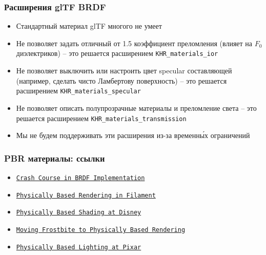 \documentclass[10pt]{beamer}
\begin{document}
\begin{frame}
\frametitle{Расширения glTF BRDF}
\begin{itemize}
\item Стандартный материал glTF многого не умеет
\pause
\item Не позволяет задать отличный от 1.5 коэффициент преломления (влияет на \begin{math}F_0\end{math} диэлектриков) -- это решается расширением \texttt{KHR\_materials\_ior}
\pause
\item Не позволяет выключить или настроить цвет specular составляющей (например, сделать чисто Ламбертову поверхность) -- это решается расширением \texttt{KHR\_materials\_specular}
\pause
\item Не позволяет описать полупрозрачные материалы и преломление света -- это решается расширением \texttt{KHR\_materials\_transmission}
\pause
\item Мы не будем поддерживать эти расширения из-за временны́х ограничений
\end{itemize}
\end{frame}

\begin{frame}
\frametitle{PBR материалы: ссылки}
\begin{itemize}
\item \href{https://boksajak.github.io/files/CrashCourseBRDF.pdf}{\texttt{Crash Course in BRDF Implementation}}
\item \href{https://google.github.io/filament/Filament.html}{\texttt{Physically Based Rendering in Filament}}
\item \href{https://media.disneyanimation.com/uploads/production/publication_asset/48/asset/s2012_pbs_disney_brdf_notes_v3.pdf}{\texttt{Physically Based Shading at Disney}}
\item \href{https://seblagarde.files.wordpress.com/2015/07/course_notes_moving_frostbite_to_pbr_v32.pdf}{\texttt{Moving Frostbite to Physically Based Rendering}}
\item \href{https://graphics.pixar.com/library/PhysicallyBasedLighting/paper.pdf}{\texttt{Physically Based Lighting at Pixar}}
\end{itemize}
\end{frame}
\end{document}
